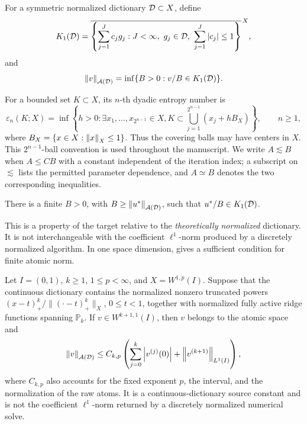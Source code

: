 \begin{definition}
\label{def:atomic}
For a symmetric normalized dictionary \(\mathcal{D}\subset X\), define
\[
 K_1(\D)=\overline{\left\{\sum_{j=1}^Jc_jg_j:
 J<\infty,\ g_j\in\D,\ \sum_{j=1}^J\abs{c_j}\leq1\right\}}^{\,X},
\]
and
\[
 \left\lVert v\right\rVert_{\mathcal A(\mathcal{D})}=
 \inf\{B>0:v/B\in K_1(\mathcal{D})\}.
\]
\end{definition}

For a bounded set \(K\subset X\), its \(n\)-th dyadic entropy number is
\[
 \varepsilon_n(K;X)=\inf\left\{h>0:\exists x_1,\ldots,x_{2^{n-1}}\in X,
 K\subset\bigcup_{j=1}^{2^{n-1}}(x_j+hB_X)\right\},\qquad n\geq1,
\]
where $B_X=\{x\in X:\left\lVert x\right\rVert_X\leq1\}$. Thus the covering balls may have centers in $X$.
This $2^{n-1}$-ball convention is used throughout the manuscript. We write
$A\lesssim B$ when $A\leq CB$ with a constant independent of the iteration index; a
subscript on $\lesssim$ lists the permitted parameter dependence, and $A\simeq B$ denotes the two
corresponding inequalities.

\begin{assumption}
\label{ass:atomic}
There is a finite \(B>0\), with \(B\geq\left\lVert u^*\right\rVert_{\mathcal A(\mathcal{D})}\), such that
\(u^*/B\in K_1(\mathcal{D})\).
\end{assumption}

This is a property of the target relative to the \emph{theoretically normalized} dictionary. It is not
interchangeable with the coefficient \(\ell^1\)-norm produced by a discretely normalized algorithm. In one
space dimension,  gives a sufficient condition for finite atomic norm.

\begin{proposition}
\label{prop:1dsource}
Let \(I=(0,1)\), \(k\geq1\), \(1\leq p<\infty\), and \(X=W^{1,p}(I)\). Suppose that the continuous
dictionary contains the normalized nonzero truncated powers \((x-t)_+^k/\|(\cdot-t)_+^k\|_X\),
\(0\leq t<1\), together with normalized fully active ridge functions spanning \(\mathbb P_k\). If
\(v\in W^{k+1,1}(I)\), then \(v\) belongs to the atomic space and
\[
\left\lVert v\right\rVert_{\mathcal A(\mathcal{D})}\leq C_{k,p}\left(
 \sum_{j=0}^k\left\lvert v^{(j)}(0)\right\rvert+\left\lVert v^{(k+1)}\right\rVert_{L^1(I)}\right),
\]
where \(C_{k,p}\) also accounts for the fixed exponent \(p\), the interval, and the normalization
of the raw atoms. It is a continuous-dictionary source constant and is not the coefficient
\(\ell^1\)-norm returned by a discretely normalized numerical solve.
\end{proposition}

